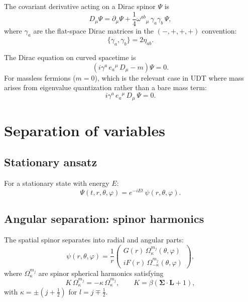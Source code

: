 \documentclass[11pt,letterpaper]{article}
\numberwithin{equation}{section}
\begin{document}
The covariant derivative acting on a Dirac spinor $\Psi$ is
\begin{equation}
\label{eq:cov_deriv}
  D_\mu\Psi = \partial_\mu\Psi + \frac{1}{4}\omega^{ab}{}_\mu\,\gamma_a\gamma_b\,\Psi,
\end{equation}
where $\gamma_a$ are the flat-space Dirac matrices in the $(-,+,+,+)$ convention:
\begin{equation}
  \{\gamma_a, \gamma_b\} = 2\eta_{ab}.
\end{equation}

The Dirac equation on curved spacetime is
\begin{equation}
\label{eq:dirac_curved}
  \left(i\gamma^a\,e_a{}^\mu\,D_\mu - m\right)\Psi = 0.
\end{equation}
For massless fermions ($m=0$), which is the relevant case in UDT where mass
arises from eigenvalue quantization rather than a bare mass term:
\begin{equation}
\label{eq:dirac_massless}
  i\gamma^a\,e_a{}^\mu\,D_\mu\,\Psi = 0.
\end{equation}

\section{Separation of variables}
\label{sec:separation}

\subsection{Stationary ansatz}

For a stationary state with energy $E$:
\begin{equation}
\label{eq:stationary}
  \Psi(t,r,\theta,\varphi) = e^{-iEt}\,\psi(r,\theta,\varphi).
\end{equation}

\subsection{Angular separation: spinor harmonics}

The spatial spinor separates into radial and angular parts:
\begin{equation}
\label{eq:angular_sep}
  \psi(r,\theta,\varphi) = \frac{1}{r}\begin{pmatrix}
    G(r)\,\Omega_\kappa^{m_j}(\theta,\varphi) \\
    iF(r)\,\Omega_{-\kappa}^{m_j}(\theta,\varphi)
  \end{pmatrix},
\end{equation}
where $\Omega_\kappa^{m_j}$ are spinor spherical harmonics satisfying
\begin{equation}
\label{eq:spinor_harmonic}
  K\,\Omega_\kappa^{m_j} = -\kappa\,\Omega_\kappa^{m_j}, \qquad
  K = \beta\!\left(\boldsymbol{\Sigma}\cdot\mathbf{L} + 1\right),
\end{equation}
with $\kappa = \pm(j+\tfrac{1}{2})$ for $l = j \mp \tfrac{1}{2}$.
\end{document}
